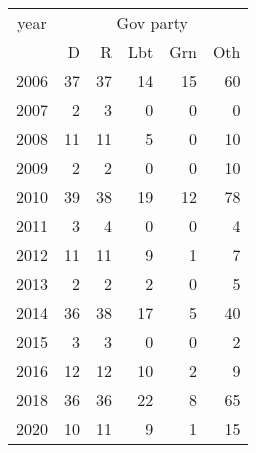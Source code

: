 \footnotesize\begin{tabular}[t]{lrrrrr}
\toprule
\multicolumn{1}{c}{year} & \multicolumn{5}{c}{Gov party} \\
\cmidrule(l{3pt}r{3pt}){1-1} \cmidrule(l{3pt}r{3pt}){2-6}
  & D & R & Lbt & Grn & Oth\\
\midrule
2006 & 37 & 37 & 14 & 15 & 60\\
2007 & 2 & 3 & 0 & 0 & 0\\
2008 & 11 & 11 & 5 & 0 & 10\\
2009 & 2 & 2 & 0 & 0 & 10\\
2010 & 39 & 38 & 19 & 12 & 78\\
2011 & 3 & 4 & 0 & 0 & 4\\
2012 & 11 & 11 & 9 & 1 & 7\\
2013 & 2 & 2 & 2 & 0 & 5\\
2014 & 36 & 38 & 17 & 5 & 40\\
2015 & 3 & 3 & 0 & 0 & 2\\
2016 & 12 & 12 & 10 & 2 & 9\\
2018 & 36 & 36 & 22 & 8 & 65\\
2020 & 10 & 11 & 9 & 1 & 15\\
\bottomrule
\end{tabular}
